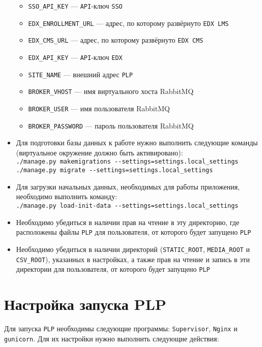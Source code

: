 \begin{itemize}
\begin{itemize}
		\item \texttt{SSO\_API\_KEY} --- \texttt{API}-ключ \texttt{SSO}
		\item \texttt{EDX\_ENROLLMENT\_URL} --- адрес, по которому развёрнуто \texttt{EDX LMS}
		\item \texttt{EDX\_CMS\_URL} --- адрес, по которому развёрнуто \texttt{EDX CMS}
		\item \texttt{EDX\_API\_KEY} --- \texttt{API}-ключ \texttt{EDX}
		\item \texttt{SITE\_NAME} --- внешний адрес \texttt{PLP}
		\item \texttt{BROKER\_VHOST} --- имя виртуального хоста RabbitMQ
		\item \texttt{BROKER\_USER} --- имя пользователя RabbitMQ
		\item \texttt{BROKER\_PASSWORD} --- пароль пользователя RabbitMQ
	\end{itemize}
	\item Для подготовки базы данных к работе нужно выполнить следующие команды (виртуальное окружение должно быть активировано):\\
		\texttt{./manage.py makemigrations -{}-settings=settings.local\_settings}\\
		\texttt{./manage.py migrate -{}-settings=settings.local\_settings}
	\item Для загрузки начальных данных, необходимых для работы приложения, необходимо выполнить команду:\\
		\texttt{./manage.py load-init-data -{}-settings=settings.local\_settings}
	\item Необходимо убедиться в наличии прав на чтение в эту директорию, где расположены файлы \texttt{PLP} для пользователя, от которого будет запущено \texttt{PLP}		
	\item Необходимо убедиться в наличии директорий (\texttt{STATIC\_ROOT}, \texttt{MEDIA\_ROOT} и \texttt{CSV\_ROOT}), указанных в настройках,
		а также прав на чтение и запись в эти директории для пользователя, от которого будет запущено \texttt{PLP}
\end{itemize}

\section{Настройка запуска PLP}
Для запуска \texttt{PLP} необходимы следующие программы: \texttt{Supervisor}, \texttt{Nginx} и \texttt{gunicorn}.
Для их настройки нужно выполнить следующие действия:

